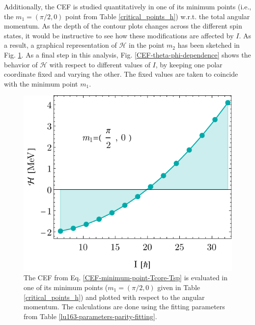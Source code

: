 Additionally, the CEF is studied quantitatively in one of its minimum points (i.e., the $m_1=(\pi/2,0)$ point from Table \ref{critical_points_h}) w.r.t. the total angular momentum. As the depth of the contour plots changes across the different spin states, it would be instructive to see how these modifications are affected by $I$. As a result, a graphical representation of $\mathcal{H}$ in the point $m_2$ has been sketched in Fig. \ref{CEF-m2-I-dependence}. As a final step in this analysis, Fig. \ref{CEF-theta-phi-dependence} shows the behavior of $\mathcal{H}$ with respect to different values of $I$, by keeping one polar coordinate fixed and varying the other. The fixed values are taken to coincide with the minimum point $m_1$.
\begin{figure}
    \centering
    \includegraphics[scale=0.75]{Chapters/Figures/parity-partners-plots/H-minimal-m1.pdf}
    \caption{The CEF from Eq. \ref{CEF-minimum-point-Tcore-Tsp} is evaluated in one of its minimum points ($m_1=(\pi/2,0)$ given in Table \ref{critical_points_h}) and plotted with respect to the angular momentum. The calculations are done using the fitting parameters from Table \ref{lu163-parameters-parity-fitting}.}
    \label{CEF-m2-I-dependence}
\end{figure}
